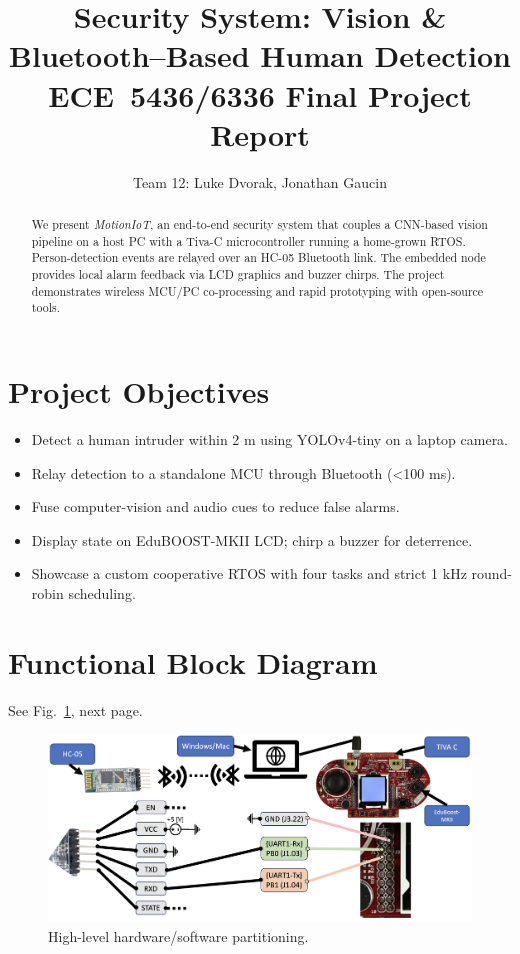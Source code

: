 \documentclass[11pt]{IEEEtran}
\title{Security System: Vision \& Bluetooth–Based Human Detection\\
ECE~5436/6336 Final Project Report}
\author{Team 12: Luke Dvorak, Jonathan Gaucin}
\begin{document}
\maketitle

\begin{abstract}
We present \textit{MotionIoT}, an end-to-end security system that couples
a CNN-based vision pipeline on a host PC with a Tiva-C microcontroller
running a home-grown RTOS.  Person-detection events are relayed over an
HC-05 Bluetooth link.  The embedded node provides local alarm feedback
via LCD graphics and buzzer chirps.  The project demonstrates wireless
MCU/PC co-processing and rapid prototyping with open-source tools.
\end{abstract}

\section{Project Objectives}
\begin{itemize}
    \item Detect a human intruder within 2 m using YOLOv4-tiny on a laptop camera.
    \item Relay detection to a standalone MCU through Bluetooth (\textless100 ms).
    \item Fuse computer-vision and audio cues to reduce false alarms.
    \item Display state on EduBOOST-MKII LCD; chirp a buzzer for deterrence.
    \item Showcase a custom cooperative RTOS with four tasks and strict 1 kHz round-robin scheduling.
\end{itemize}

\section{Functional Block Diagram}
See Fig.~\ref{fig:se}, next page.
\begin{figure}[t]
    \centering
    \includegraphics[width=\textwidth]{images/hardware_diagram.png} %
    \caption{High-level hardware/software partitioning.}
\label{fig:se}
\end{figure}
\end{document}
